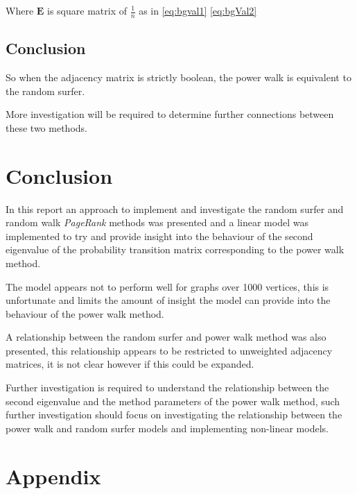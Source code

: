 \documentclass[11pt]{report}
\begin{document}
Where \(\mathbf{E}\) is square matrix of \(\frac{1}{n}\) as in \eqref{eq:bgval1}  \eqref{eq:bgVal2}

\subsection{Conclusion}
\label{sec:orgad79e88}
So when the adjacency matrix is strictly boolean, the power walk is equivalent to the random surfer.

More investigation will be required to determine further connections between these two methods.

\section{Conclusion}
\label{sec:orgc228632}
In this report an approach to implement and investigate the random surfer and random walk \emph{PageRank} methods was presented and a linear model was implemented to try and provide insight into the behaviour of the second eigenvalue of the probability transition matrix corresponding to the power walk method.

The model appears not to perform well for graphs over 1000 vertices, this is unfortunate and limits the amount of insight the model can provide into the behaviour of the power walk method.

A relationship between the random surfer and power walk method was also presented, this relationship appears to be restricted to unweighted adjacency matrices, it is not clear however if this could be expanded.

Further investigation is required to understand the relationship between the
second eigenvalue and the method parameters of the power walk method, such
further investigation should focus on investigating the relationship between the
power walk and random surfer models and implementing non-linear models.


\section{Appendix}
\label{sec:orgdf858c5}
\appendix
\end{document}
